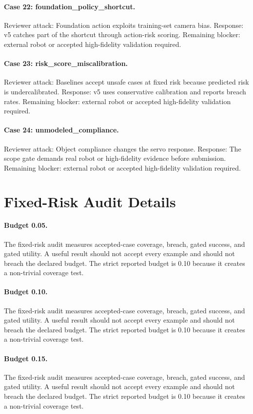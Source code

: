 \documentclass{article}
\begin{document}
\paragraph{Case 22: foundation\_policy\_shortcut.} Reviewer attack: Foundation action exploits training-set camera bias. Response: v5 catches part of the shortcut through action-risk scoring. Remaining blocker: external robot or accepted high-fidelity validation required.
\paragraph{Case 23: risk\_score\_miscalibration.} Reviewer attack: Baselines accept unsafe cases at fixed risk because predicted risk is undercalibrated. Response: v5 uses conservative calibration and reports breach rates. Remaining blocker: external robot or accepted high-fidelity validation required.
\paragraph{Case 24: unmodeled\_compliance.} Reviewer attack: Object compliance changes the servo response. Response: The scope gate demands real robot or high-fidelity evidence before submission. Remaining blocker: external robot or accepted high-fidelity validation required.
\clearpage
\section{Fixed-Risk Audit Details}
\paragraph{Budget 0.05.} The fixed-risk audit measures accepted-case coverage, breach, gated success, and gated utility. A useful result should not accept every example and should not breach the declared budget. The strict reported budget is 0.10 because it creates a non-trivial coverage test.
\paragraph{Budget 0.10.} The fixed-risk audit measures accepted-case coverage, breach, gated success, and gated utility. A useful result should not accept every example and should not breach the declared budget. The strict reported budget is 0.10 because it creates a non-trivial coverage test.
\paragraph{Budget 0.15.} The fixed-risk audit measures accepted-case coverage, breach, gated success, and gated utility. A useful result should not accept every example and should not breach the declared budget. The strict reported budget is 0.10 because it creates a non-trivial coverage test.
\end{document}
